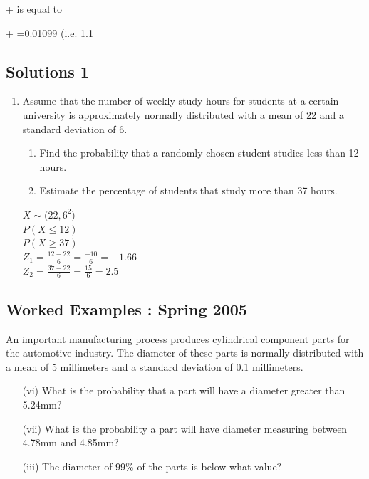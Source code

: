 ﻿\documentclass[]{report}
\begin{document}
+ is equal to

+ =0.01099  	(i.e. 1.1%










\subsection{Solutions 1}

\begin{enumerate}
	
	\item Assume that the number of weekly study hours for students at a certain university
	is approximately normally distributed with a mean of 22 and a standard deviation
	of 6.
	\begin{enumerate}
		\item Find the probability that a randomly chosen student studies less than 12
		hours.
		\item Estimate the percentage of students that study more than 37 hours.
	\end{enumerate}
	
	
	$X \sim \mathcal(22,6^2)$\\
	$P(X \leq 12)$\\
	$P(X \geq 37)$\\
	$Z_1 = \frac{12 - 22}{6} = \frac{-10}{6} = -1.66 $\\
	$Z_2 = \frac{37 - 22}{6} = \frac{15}{6} = 2.5 $
	
	
\end{enumerate}



\subsection{Worked Examples : Spring 2005 }
An important manufacturing process produces cylindrical component parts for the automotive industry. The diameter of these parts is normally distributed with a mean of 5 millimeters and a standard deviation of 0.1 millimeters.

\begin{itemize}
	\item[(vi)]	What is the probability that a part will have a diameter greater than 5.24mm?
	\item[(vii)]	What is the probability a part will have diameter measuring between 4.78mm and 4.85mm?
	\item[(iii)]	The diameter of 99\% of the parts is below what value?
	
\end{itemize}		
\end{document}
